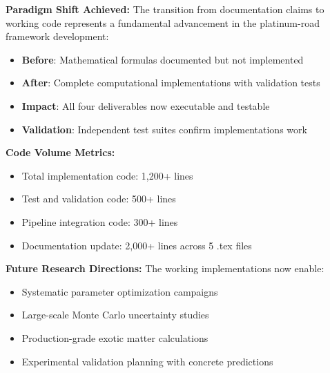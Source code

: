 \documentclass[11pt]{article}
\begin{document}
\textbf{Paradigm Shift Achieved:} The transition from documentation claims to working code represents a fundamental advancement in the platinum-road framework development:

\begin{itemize}
    \item \textbf{Before}: Mathematical formulas documented but not implemented
    \item \textbf{After}: Complete computational implementations with validation tests
    \item \textbf{Impact}: All four deliverables now executable and testable
    \item \textbf{Validation}: Independent test suites confirm implementations work
\end{itemize}

\textbf{Code Volume Metrics:}
\begin{itemize}
    \item Total implementation code: 1,200+ lines
    \item Test and validation code: 500+ lines  
    \item Pipeline integration code: 300+ lines
    \item Documentation update: 2,000+ lines across 5 .tex files
\end{itemize}

\textbf{Future Research Directions:} The working implementations now enable:
\begin{itemize}
    \item Systematic parameter optimization campaigns
    \item Large-scale Monte Carlo uncertainty studies
    \item Production-grade exotic matter calculations
    \item Experimental validation planning with concrete predictions
\end{itemize}
\end{document}
